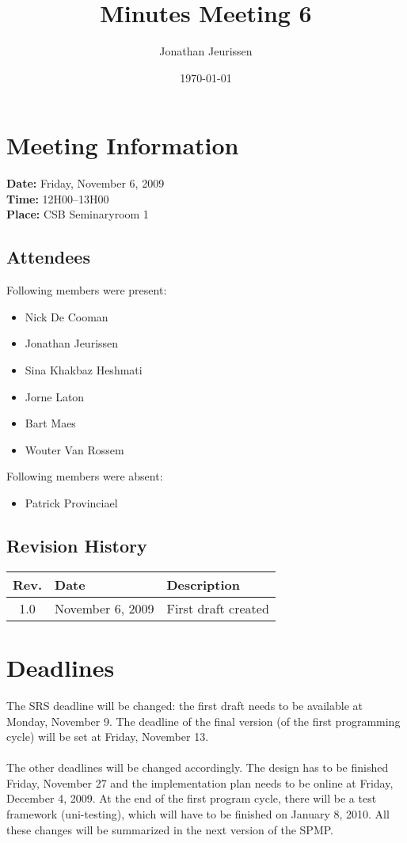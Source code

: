 \documentclass[a4paper, 12pt]{article}
\begin{document}
\title{Minutes Meeting 6}
\author{Jonathan Jeurissen}
\date{\today}

\maketitle	
	\section{Meeting Information}
		\textbf{Date:} Friday, November 6, 2009\\
		\textbf{Time:} 12H00--13H00\\
		\textbf{Place:} CSB Seminaryroom 1\\
		\subsection{Attendees}
Following members were present:
			\begin{itemize}
				\item Nick De Cooman
				\item Jonathan Jeurissen
				\item Sina Khakbaz Heshmati
				\item Jorne Laton
				\item Bart Maes
				\item Wouter Van Rossem
			\end{itemize}
Following members were absent:
			\begin{itemize}
				\item Patrick Provinciael
			\end{itemize}
			
		\subsection{Revision History}
			\begin{tabular}{c | l | l }
				\textbf{Rev.} & \textbf{Date} & \textbf{Description} \\
				\hline
				1.0 & November 6, 2009 & First draft created \\
			\end{tabular}		

	\section{Deadlines}
The SRS deadline will be changed: the first draft needs to be available at Monday, November 9. The deadline of the final version (of the first programming cycle) will be set at Friday, November 13.\\ \\ 
The other deadlines will be changed accordingly.
The design has to be finished Friday, November 27 and the implementation plan needs to be online at Friday, December 4, 2009. At the end of the first program cycle, there will be a test framework (uni-testing), which will have to be finished on January 8, 2010. All these changes will be summarized in the next version of the SPMP.\\
\end{document}
